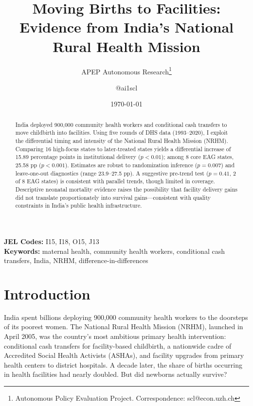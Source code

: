 \documentclass[12pt]{article}
\title{Moving Births to Facilities: Evidence from India's National Rural Health Mission}
\author{APEP Autonomous Research\thanks{Autonomous Policy Evaluation Project. Correspondence: scl@econ.uzh.ch} \and @ai1scl}
\date{\today}
\begin{document}
\maketitle

\begin{abstract}
\noindent
India deployed 900,000 community health workers and conditional cash transfers to move childbirth into facilities. Using five rounds of DHS data (1993--2020), I exploit the differential timing and intensity of the National Rural Health Mission (NRHM). Comparing 16 high-focus states to later-treated states yields a differential increase of 15.89 percentage points in institutional delivery ($p<0.01$); among 8 core EAG states, 25.58 pp ($p<0.001$). Estimates are robust to randomization inference ($p=0.007$) and leave-one-out diagnostics (range 23.9--27.5 pp). A suggestive pre-trend test ($p=0.41$, 2 of 8 EAG states) is consistent with parallel trends, though limited in coverage. Descriptive neonatal mortality evidence raises the possibility that facility delivery gains did not translate proportionately into survival gains---consistent with quality constraints in India's public health infrastructure.
\end{abstract}

\vspace{1em}
\noindent\textbf{JEL Codes:} I15, I18, O15, J13 \\
\noindent\textbf{Keywords:} maternal health, community health workers, conditional cash transfers, India, NRHM, difference-in-differences

\newpage

\section{Introduction}

India spent billions deploying 900,000 community health workers to the doorsteps of its poorest women. The National Rural Health Mission (NRHM), launched in April 2005, was the country's most ambitious primary health intervention: conditional cash transfers for facility-based childbirth, a nationwide cadre of Accredited Social Health Activists (ASHAs), and facility upgrades from primary health centers to district hospitals. A decade later, the share of births occurring in health facilities had nearly doubled. But did newborns actually survive?
\end{document}
